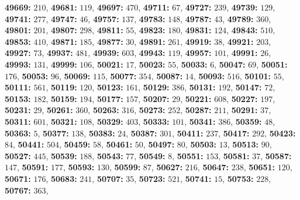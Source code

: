 \textsf{\bfseries 49669:} $210$, \textsf{\bfseries 49681:} $119$, \textsf{\bfseries 49697:} $470$, \textsf{\bfseries 49711:} $67$, \textsf{\bfseries 49727:} $239$, \textsf{\bfseries 49739:} $129$, \textsf{\bfseries 49741:} $277$, \textsf{\bfseries 49747:} $46$, \textsf{\bfseries 49757:} $137$, \textsf{\bfseries 49783:} $148$, \textsf{\bfseries 49787:} $43$, \textsf{\bfseries 49789:} $360$, \textsf{\bfseries 49801:} $201$, \textsf{\bfseries 49807:} $298$, \textsf{\bfseries 49811:} $55$, \textsf{\bfseries 49823:} $180$, \textsf{\bfseries 49831:} $124$, \textsf{\bfseries 49843:} $510$, \textsf{\bfseries 49853:} $410$, \textsf{\bfseries 49871:} $185$, \textsf{\bfseries 49877:} $30$, \textsf{\bfseries 49891:} $261$, \textsf{\bfseries 49919:} $38$, \textsf{\bfseries 49921:} $203$, \textsf{\bfseries 49927:} $73$, \textsf{\bfseries 49937:} $481$, \textsf{\bfseries 49939:} $603$, \textsf{\bfseries 49943:} $119$, \textsf{\bfseries 49957:} $101$, \textsf{\bfseries 49991:} $26$, \textsf{\bfseries 49993:} $131$, \textsf{\bfseries 49999:} $106$, \textsf{\bfseries 50021:} $17$, \textsf{\bfseries 50023:} $55$, \textsf{\bfseries 50033:} $6$, \textsf{\bfseries 50047:} $69$, \textsf{\bfseries 50051:} $176$, \textsf{\bfseries 50053:} $96$, \textsf{\bfseries 50069:} $115$, \textsf{\bfseries 50077:} $354$, \textsf{\bfseries 50087:} $14$, \textsf{\bfseries 50093:} $516$, \textsf{\bfseries 50101:} $55$, \textsf{\bfseries 50111:} $561$, \textsf{\bfseries 50119:} $120$, \textsf{\bfseries 50123:} $161$, \textsf{\bfseries 50129:} $386$, \textsf{\bfseries 50131:} $192$, \textsf{\bfseries 50147:} $72$, \textsf{\bfseries 50153:} $182$, \textsf{\bfseries 50159:} $194$, \textsf{\bfseries 50177:} $157$, \textsf{\bfseries 50207:} $29$, \textsf{\bfseries 50221:} $608$, \textsf{\bfseries 50227:} $197$, \textsf{\bfseries 50231:} $29$, \textsf{\bfseries 50261:} $360$, \textsf{\bfseries 50263:} $316$, \textsf{\bfseries 50273:} $252$, \textsf{\bfseries 50287:} $211$, \textsf{\bfseries 50291:} $37$, \textsf{\bfseries 50311:} $601$, \textsf{\bfseries 50321:} $108$, \textsf{\bfseries 50329:} $403$, \textsf{\bfseries 50333:} $101$, \textsf{\bfseries 50341:} $386$, \textsf{\bfseries 50359:} $48$, \textsf{\bfseries 50363:} $5$, \textsf{\bfseries 50377:} $138$, \textsf{\bfseries 50383:} $24$, \textsf{\bfseries 50387:} $301$, \textsf{\bfseries 50411:} $237$, \textsf{\bfseries 50417:} $292$, \textsf{\bfseries 50423:} $84$, \textsf{\bfseries 50441:} $504$, \textsf{\bfseries 50459:} $58$, \textsf{\bfseries 50461:} $50$, \textsf{\bfseries 50497:} $80$, \textsf{\bfseries 50503:} $13$, \textsf{\bfseries 50513:} $90$, \textsf{\bfseries 50527:} $445$, \textsf{\bfseries 50539:} $188$, \textsf{\bfseries 50543:} $77$, \textsf{\bfseries 50549:} $8$, \textsf{\bfseries 50551:} $153$, \textsf{\bfseries 50581:} $37$, \textsf{\bfseries 50587:} $147$, \textsf{\bfseries 50591:} $177$, \textsf{\bfseries 50593:} $130$, \textsf{\bfseries 50599:} $87$, \textsf{\bfseries 50627:} $216$, \textsf{\bfseries 50647:} $238$, \textsf{\bfseries 50651:} $120$, \textsf{\bfseries 50671:} $176$, \textsf{\bfseries 50683:} $241$, \textsf{\bfseries 50707:} $35$, \textsf{\bfseries 50723:} $521$, \textsf{\bfseries 50741:} $15$, \textsf{\bfseries 50753:} $228$, \textsf{\bfseries 50767:} $363$, 
